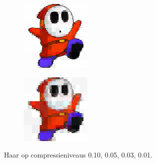 \begin{figure}
\begin{subfigure}[b]{0.24\textwidth}
  \end{subfigure}
  \begin{subfigure}[b]{0.24\textwidth}
    \centering
    \includegraphics[width=\textwidth]{plaatjes/shyguy_haar_0_03.png}
  \end{subfigure}
  \begin{subfigure}[b]{0.24\textwidth}
    \centering
    \includegraphics[width=\textwidth]{plaatjes/shyguy_haar_0_01.png}
  \end{subfigure}
  \caption{Haar op compressieniveaus 0.10, 0.05, 0.03, 0.01.}
\end{figure}
